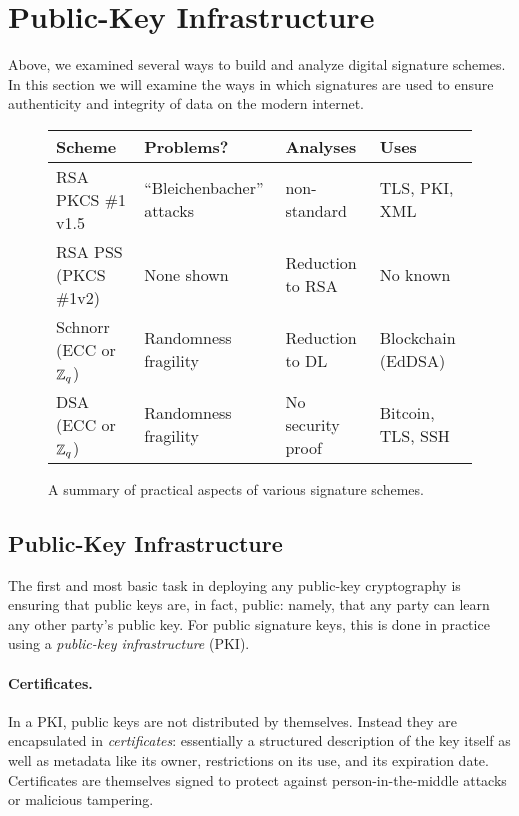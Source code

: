 \section*{Public-Key Infrastructure}
\label{sec:idprots_contd}

Above, we examined several ways to build and analyze digital signature schemes.
In this section we will examine the ways in which signatures are used to
ensure authenticity and integrity of data on the modern internet.



\begin{figure}[t]
  \centering
  \begin{tabular}{|l|l|p{4cm}|p{4.2cm}|}
    \hline
    Scheme & Problems? & Analyses & Uses\\
    \hline
    \hline
    RSA PKCS \#1 v1.5 & ``Bleichenbacher'' attacks & non-standard~\cite{jager2018security} & TLS, PKI, XML\\
    \hline
    RSA PSS (PKCS \#1v2) & None shown & Reduction to RSA~\cite{bellare1998pss} & No known\\
    \hline
    Schnorr (ECC or ${{\mathbb Z}}_q$) & Randomness fragility &  Reduction to DL~\cite{schnorr1989efficient} & Blockchain (EdDSA)~\cite{eddsa}\\
    \hline
    DSA (ECC or ${{\mathbb Z}}_q$) & Randomness fragility~\cite{ecdsa_ps3} & No security proof & Bitcoin, TLS, SSH\\
    \hline
    \end{tabular}
    \caption{A summary of practical aspects of various signature schemes.}
    \label{fig:realworld-sigs}
  \end{figure}
    



\subsection{Public-Key Infrastructure}
\label{sec:idprots_contd:pki}

The first and most basic task in deploying any public-key cryptography is ensuring
that public keys are, in fact, public: namely, that any party can learn any other
party's public key. For public signature keys, this is done in practice using a
\emph{public-key infrastructure} (PKI).

\paragraph{Certificates.} In a PKI, public keys are not distributed by themselves.
Instead they are encapsulated in \emph{certificates}: essentially a structured
description of the key itself as well as metadata like its owner, restrictions
on its use, and its expiration date. Certificates are themselves signed to protect
against person-in-the-middle attacks or malicious tampering.

